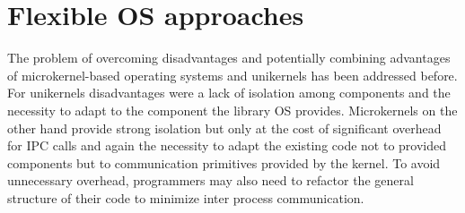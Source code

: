 \section{Flexible OS approaches}
\label{sec:FlexibleOSes}
The problem of overcoming disadvantages and potentially combining advantages of microkernel-based operating systems and unikernels has been addressed before. For unikernels disadvantages were a lack of isolation among components and the necessity to adapt to the component the library OS provides. Microkernels on the other hand provide strong isolation but only at the cost of significant overhead for IPC calls and again the necessity to adapt the existing code not to provided components but to communication primitives provided by the kernel. To avoid unnecessary overhead, programmers may also need to refactor the general structure of their code to minimize inter process communication. \\

